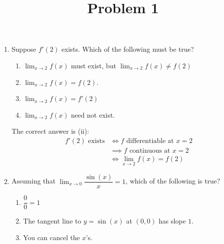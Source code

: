 \documentclass{ximera}
\title[Problem 1]{Problem 1}
\begin{document}
\begin{abstract} \end{abstract}
\maketitle


\begin{problem}
	
	\begin{enumerate}

    \item
   
      Suppose $f'(2)$ exists. Which of the following must be true?
      \begin{enumerate}
        \item
          $\displaystyle \lim_{x \to 2} f(x)$ must exist, but $\displaystyle \lim_{x \to 2} f(x) \ne f(2)$

        \item
          $\displaystyle \lim_{x \to 2} f(x) = f(2)$.

        \item
          $\displaystyle \lim_{x \to 2} f(x) = f'(2)$

        \item
          $\displaystyle \lim_{x \to 2} f(x)$ need not exist.
      \end{enumerate}
      \begin{explanation}
        The correct answer is (ii):
        \begin{align*}
          \mbox{$f'(2)$ exists} &\iff \mbox{$f$ differentiable at $x = 2$}\\
                                &\implies \mbox{$f$ continuous at $x = 2$}\\
                                &\iff \displaystyle \lim_{x \to 2} f(x) = f(2)
        \end{align*}
      \end{explanation}
\item

      Assuming that $\displaystyle \lim_{x \to 0} \dfrac{\sin(x)}{x} = 1$, which of the following is true?
      \begin{enumerate}
        \item
          $\dfrac{0}{0} = 1$
        \item
          The tangent line to $y = \sin(x)$ at $(0,0)$ has slope $1$.

        \item
          You can cancel the $x$'s.


\end{enumerate}
\end{enumerate}
\end{problem}
\end{document}
